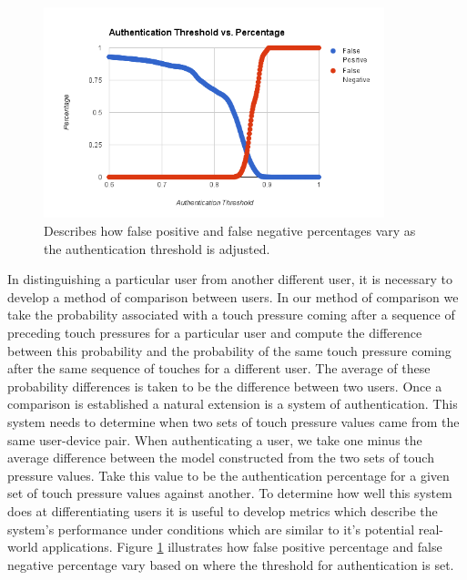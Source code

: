 \documentclass{acm_proc_article-sp}
\begin{document}
\begin{figure}
\centering
\includegraphics[width=3.9in]{threshold_vs_percentages.png}
\caption{Describes how false positive and false negative percentages vary as the authentication threshold is adjusted.}
\label{fig:threshold_vs_percentages}
\end{figure}

In distinguishing a particular user from another different user, it is necessary to develop a method of comparison between users. In our method of comparison we take the probability associated with a touch pressure coming after a sequence of preceding touch pressures for a particular user and compute the difference between this probability and the probability of the same touch pressure coming after the same sequence of touches for a different user. The average of these probability differences is taken to be the difference between two users.
%
Once a comparison is established a natural extension is a system of authentication. This system needs to determine when two sets of touch pressure values came from the same user-device pair. When authenticating a user, we take one minus the average difference between the model constructed from the two sets of touch pressure values. Take this value to be the authentication percentage for a given set of touch pressure values against another.
%
To determine how well this system does at differentiating users it is useful to develop metrics which describe the system's performance under conditions which are similar to it's potential real-world applications. Figure \ref{fig:threshold_vs_percentages} illustrates how false positive percentage and false negative percentage vary based on where the threshold for authentication is set. 
\end{document}

